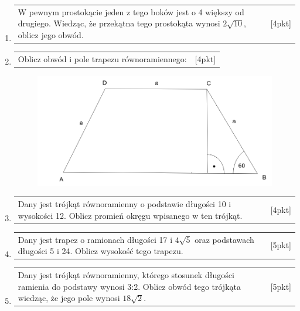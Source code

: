 \documentclass[12pt,a4paper]{article}
\begin{document}
\begin{enumerate}[1.]
\begin{figure}[h]
	\end{figure}
		\item  \begin{tabular}{p{13cm} r}
			W pewnym prostokącie jeden z tego boków jest o 4 większy od drugiego. Wiedząc, że przekątna tego prostokąta wynosi $2\sqrt{10}$, oblicz jego obwód.&[4pkt]\\ 
		\end{tabular}
	\newpage
		\item  \begin{tabular}{p{13cm} r}
			Oblicz obwód i pole trapezu równoramiennego: &[4pkt]\\ 
		\end{tabular}
	\begin{figure}[h]
		\includegraphics[scale=0.6]{p3}
	\end{figure}
		\item  \begin{tabular}{p{13cm} r}
			Dany jest trójkąt równoramienny o podstawie długości 10 i wysokości 12. Oblicz promień okręgu wpisanego w ten trójkąt. &[4pkt]\\ 
		\end{tabular}
		\item  \begin{tabular}{p{13cm} r}
			Dany jest trapez o ramionach długości 17 i $4\sqrt{5}$ oraz podstawach długości 5 i 24. Oblicz wysokość tego trapezu. &[5pkt]\\ 
		\end{tabular}
		\item  \begin{tabular}{p{13cm} r}
			Dany jest trójkąt równoramienny, którego stosunek długości ramienia do podstawy wynosi 3:2. Oblicz obwód tego trójkąta wiedząc, że jego pole wynosi $18\sqrt{2}$. &[5pkt]\\ 
		\end{tabular}
	\end{enumerate}
\end{document}
